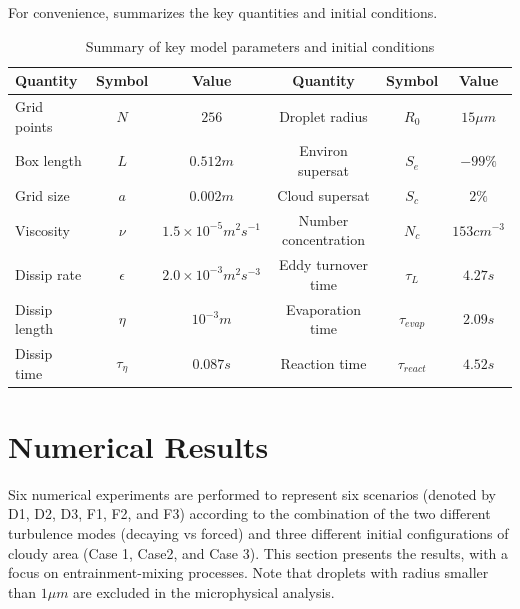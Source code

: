 \documentclass[draft,linenumbers]{AGUJournal}
\begin{document}
For convenience,  summarizes the key quantities and initial conditions.
\begin{table}
\centering
\caption{Summary of key model parameters and initial conditions}
\label{tb:parameters}
\begin{tabular}{l c c c c c}
\hline
Quantity & Symbol & Value & Quantity & Symbol & Value\\
\hline
Grid points & $N$ & $256$ & Droplet radius & $R_{0}$ & $15\mu m$\\
Box length & $L$ & $0.512m$ & Environ supersat & $S_{e}$ & $-99\%$\\
Grid size & $a$ & $0.002m$ & Cloud supersat & $S_{c}$ & $2\%$\\
Viscosity & $\nu$ & $1.5\times10^{-5}m^{2}s^{-1}$ & Number concentration& $N_{c}$ & $153cm^{-3}$\\
Dissip rate& $\epsilon$ & $2.0\times10^{-3}m^{2}s^{-3}$ & Eddy turnover time & $\tau_{L}$ & $4.27s$\\
Dissip length& $\eta$ & $10^{-3}m$ & Evaporation time & $\tau_{evap}$ & $2.09s$\\
Dissip time& $\tau_{\eta}$ & $0.087s$ & Reaction time & $\tau_{react}$ & $4.52s$\\
\hline
\end{tabular}
\end{table}

\section{Numerical Results}\label{numerical_results}
Six numerical experiments are performed to represent six scenarios (denoted by D1, D2, D3, F1, F2, and F3) according to the combination of the two different turbulence modes (decaying vs forced) and three different initial configurations of cloudy area (Case 1, Case2, and Case 3). This section presents the results, with a focus on entrainment-mixing processes. Note that droplets with radius smaller than $1\mu m$ are excluded in the microphysical analysis. 
\end{document}
